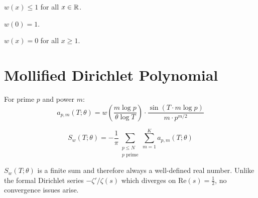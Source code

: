 \begin{theorem}\label{thm:kernel_bounded}
    \leanok
    $w(x) \leq 1$ for all $x \in \mathbb{R}$.
\end{theorem}

\begin{theorem}\label{thm:kernel_zero}
    \leanok
    $w(0) = 1$.
\end{theorem}

\begin{theorem}\label{thm:kernel_support}
    \leanok
    $w(x) = 0$ for all $x \geq 1$.
\end{theorem}

\section{Mollified Dirichlet Polynomial}

\begin{definition}\label{def:primePowerTerm}
    \leanok
    For prime $p$ and power $m$:
    \[
        a_{p,m}(T; \theta) = w\!\left(\frac{m\log p}{\theta\log T}\right)
        \cdot \frac{\sin(T \cdot m\log p)}{m \cdot p^{m/2}}
    \]
\end{definition}

\begin{definition}\label{def:S_mollified}
    \leanok
    \[
        S_w(T; \theta) = -\frac{1}{\pi} \sum_{\substack{p \leq N \\ p\text{ prime}}}
        \sum_{m=1}^{K} a_{p,m}(T; \theta)
    \]
\end{definition}

\begin{theorem}\label{thm:S_welldefined}
    \leanok
    $S_w(T; \theta)$ is a finite sum and therefore always a well-defined real number.
    Unlike the formal Dirichlet series $-\zeta'/\zeta(s)$ which diverges on
    $\mathrm{Re}(s) = \frac{1}{2}$, no convergence issues arise.
\end{theorem}

